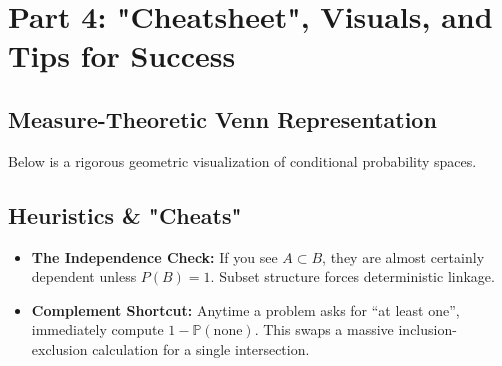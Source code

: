 \documentclass[11pt, letterpaper]{article}
\theoremstyle{definition}
\begin{document}
\section{Part 4: "Cheatsheet", Visuals, and Tips for Success}

\subsection{Measure-Theoretic Venn Representation}
Below is a rigorous geometric visualization of conditional probability spaces.

\begin{center}
\end{center}

\subsection{Heuristics \& "Cheats"}
\begin{itemize}
    \item \textbf{The Independence Check:} If you see $A \subset B$, they are almost certainly dependent unless $P(B) = 1$. Subset structure forces deterministic linkage.
    \item \textbf{Complement Shortcut:} Anytime a problem asks for ``at least one'', immediately compute $1 - \mathbb{P}(\text{none})$. This swaps a massive inclusion-exclusion calculation for a single intersection.
\end{itemize}
\end{document}

